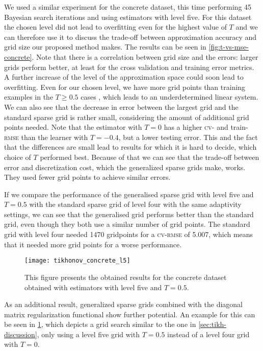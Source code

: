 We used a similar experiment for the concrete dataset, this time performing 45
Bayesian search iterations and using estimators with level five.
For this dataset the chosen level did not lead to overfitting even for the
highest value of \(T\) and we can therefore use it to discuss the trade-off
between approximation accuracy and grid size our proposed method makes.
The results can be seen in \cref{fig:t-vs-mse-concrete}.
Note that there is a correlation between grid size and the errors: larger grids
perform better, at least for the cross validation and training error metrics.
A further increase of the level of the approximation space could soon lead to overfitting.
Even for our chosen level, we have more grid points than training examples in the \(T \geq 0.5\) cases , which leads to an underdetermined linear system.
We can also see that the decrease in error between the largest grid and the standard sparse grid is rather small, considering the amount of additional grid points needed.
Note that the estimator with \(T = 0\) has a higher \textsc{cv}- and
train-\textsc{rmse} than the learner with \(T = -0.4\), but a lower testing
error.
This and the fact that the differences are small lead to results for which it is
hard to decide, which choice of \(T\) performed best.
Because of that we can see that the trade-off between error and discretization cost, which the generalized sparse grids make, works.
They used fewer grid points to achieve similar errors.

If we compare the performance of the generalised sparse grid with level five and
\(T = 0.5\) with the standard sparse grid of level four with the same adaptivity
settings, we can see that the generalised grid performs better than the standard grid, even though they both
use a similar number of grid points.
The standard grid with level four needed 1470 gridpoints for a \textsc{cv-rmse}
of 5.007, which means that it needed more grid points for a worse performance.

\begin{figure}[htb]
  \centering
  \texttt{[image: tikhonov\_concrete\_l5]}
  \caption{This figure presents the obtained results for the concrete dataset
    obtained with estimators with level five and \(T = 0.5\).}
  \label{fig:tikhonov-concrete-l5}
\end{figure}

As an additional result, generalized sparse grids combined with the diagonal
matrix regularization functional show further potential.
An example for this can be seen in \cref{fig:tikhonov-concrete-l5}, which depicts a grid search
similar to the one in \cref{sec:tikh-discussion}, only using a level five grid
with \(T = 0.5\) instead of a level four grid with \(T = 0\).

